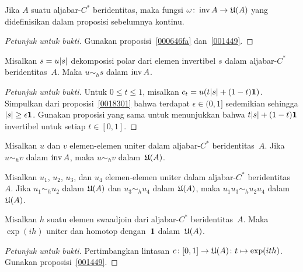 \begin{prop}\label{K002021} Jika $A$ suatu aljabar-$C^*$ beridentitas, maka fungsi $\omega\colon \operatorname{inv} A \rightarrow \mathfrak{U}(A)$
yang didefinisikan dalam proposisi sebelumnya kontinu.
\end{prop}

\begin{proof}[\emph{Petunjuk untuk bukti}] Gunakan proposisi~\ref{000646fa} dan~\ref{001449}.   \ns
\end{proof}

\begin{prop}\label{K002024} Misalkan $s = u\lvert s\rvert$ dekomposisi polar dari elemen invertibel $s$ dalam aljabar-$C^*$ beridentitas~$A$.
Maka $u \sim_h s$ dalam $\operatorname{inv} A$.
\end{prop}

\begin{proof}[\emph{Petunjuk untuk bukti}] Untuk $0 \le t \le 1$, misalkan $c_t = u(t\lvert s\rvert + (1 - t)\mathbf{1})$. Simpulkan dari
proposisi~\ref{0018301} bahwa terdapat $\epsilon \in (0,1]$ sedemikian sehingga $\lvert s\rvert \ge \epsilon \mathbf{1}$. Gunakan proposisi yang sama
untuk menunjukkan bahwa $t\lvert s\rvert + (1 - t)\mathbf{1}$ invertibel untuk setiap $t \in [0,1]$.   \ns
\end{proof}

\begin{prop}\label{K002027} Misalkan $u$ dan $v$ elemen-elemen uniter dalam aljabar-$C^*$ beridentitas~$A$. Jika $u \sim_h v$ dalam $\operatorname{inv} A$,
maka $u \sim_h v$ dalam~$\mathfrak{U}(A)$.
\end{prop}

\begin{prop}\label{K002031} Misalkan $u_1$, $u_2$, $u_3$, dan $u_4$ elemen-elemen uniter dalam aljabar-$C^*$ beridentitas~$A$.
Jika $u_1 \sim_h u_2$ dalam $\mathfrak{U}(A)$ dan $u_3 \sim_h u_4$ dalam $\mathfrak{U}(A)$, maka $u_1u_3 \sim_h u_2u_4$ dalam~$\mathfrak{U}(A)$.
\end{prop}

\begin{exam}\label{0060116} Misalkan $h$ suatu elemen swaadjoin dari aljabar-$C^*$ beridentitas~$A$. Maka $\exp(ih)$ uniter dan
homotop dengan~$\mathbf{1}$ dalam~$\mathfrak{U}(A)$.
\end{exam}

\begin{proof}[\emph{Petunjuk untuk bukti}] Pertimbangkan lintasan $c\colon [0,1] \rightarrow \mathfrak{U}(A)\colon t \mapsto \exp(ith)$. Gunakan %
proposisi~\ref{001449}.  \ns
\end{proof}

